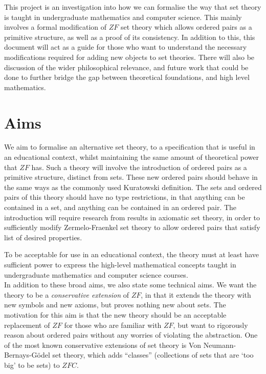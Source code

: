 \documentclass[11pt]{report}
\theoremstyle{definition}
\theoremstyle{theorem}
\theoremstyle{lemma}
\begin{document}
This project is an investigation into how we can formalise the way that set theory is taught in undergraduate mathematics and computer science.
This mainly involves a formal modification of $\mathit{ZF}$ set theory which allows ordered pairs as a primitive structure, as well as a proof of its consistency.
In addition to this, this document will act as a guide for those who want to understand the necessary modifications required for adding new objects to set theories. 
There will also be discussion of the wider philosophical relevance, and future work that could be done to further bridge the gap between theoretical foundations, and high level mathematics. 

\section{Aims}
We aim to formalise an alternative set theory, to a specification that is useful in an educational context, whilst maintaining the same amount of theoretical power that $\mathit{ZF}$ has.
Such a theory will involve the introduction of ordered pairs as a primitive structure, distinct from sets.
These new ordered pairs should behave in the same ways as the commonly used Kuratowski definition.
The sets and ordered pairs of this theory should have no type restrictions, in that anything can be contained in a set, and anything can be contained in an ordered pair.
The introduction will require research from results in axiomatic set theory, in order to sufficiently modify Zermelo-Fraenkel set theory to allow ordered pairs that satisfy list of desired properties.

To be acceptable for use in an educational context, the theory must at least have sufficient power to express the high-level mathematical concepts taught in undergraduate mathematics and computer science courses.\\

In addition to these broad aims, we also state some technical aims. 
We want the theory to be a \emph{conservative extension} of $\mathit{ZF}$, in that it extends the theory with new symbols and new axioms, but proves nothing new about sets.
The motivation for this aim is that the new theory should be an acceptable replacement of $\mathit{ZF}$ for those who are familiar with $\mathit{ZF}$, but want to rigorously reason about ordered pairs without any worries of violating the abstraction.
One of the most known conservative extensions of set theory is Von Neumann-Bernays-G\"odel set theory, which adds ``classes'' (collections of sets that are `too big' to be sets) to $\mathit{ZFC}$. 
\end{document}
